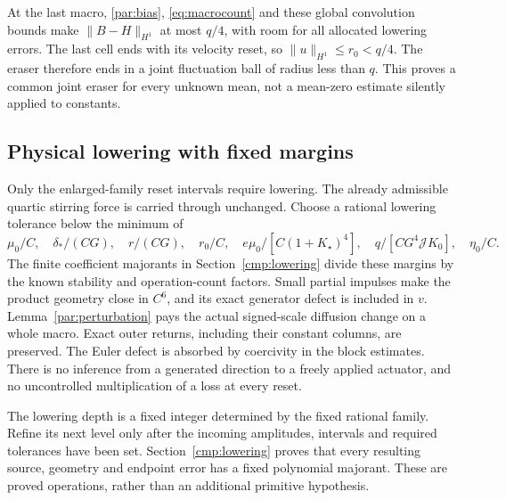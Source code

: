 \documentclass[11pt,a4paper]{amsart}
\theoremstyle{definition}
\theoremstyle{remark}
\numberwithin{equation}{section}
\newcommand{\norm}[1]{\lVert #1\rVert}
\begin{document}
At the last macro, \eqref{par:bias}, \eqref{eq:macrocount} and these global convolution bounds make $\norm{B-H}_{H^1}$ at most $q/4$, with room for all allocated lowering errors. The last cell ends with its velocity reset, so $\norm u_{H^1}\le r_0<q/4$. The eraser therefore ends in a joint fluctuation ball of radius less than $q$. This proves a common joint eraser for every unknown mean, not a mean-zero estimate silently applied to constants.

\subsection{Physical lowering with fixed margins}
Only the enlarged-family reset intervals require lowering. The already admissible quartic stirring force is carried through unchanged. Choose a rational lowering tolerance below the minimum of
\[
 \mu_0/C,\quad\delta_* /(CG),\quad r/(CG),\quad r_0/C,\quad
 e\mu_0/[C(1+K_\star)^4],\quad q/[CG^4\mathcal J K_0],\quad\eta_0/C.
\]
The finite coefficient majorants in Section~\ref{cmp:lowering} divide these margins by the known stability and operation-count factors. Small partial impulses make the product geometry close in $C^6$, and its exact generator defect is included in $v$. Lemma~\ref{par:perturbation} pays the actual signed-scale diffusion change on a whole macro. Exact outer returns, including their constant columns, are preserved. The Euler defect is absorbed by coercivity in the block estimates. There is no inference from a generated direction to a freely applied actuator, and no uncontrolled multiplication of a loss at every reset.

The lowering depth is a fixed integer determined by the fixed rational family. Refine its next level only after the incoming amplitudes, intervals and required tolerances have been set. Section~\ref{cmp:lowering} proves that every resulting source, geometry and endpoint error has a fixed polynomial majorant. These are proved operations, rather than an additional primitive hypothesis.
\end{document}
